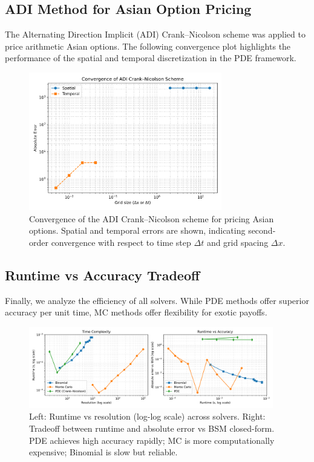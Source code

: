 \documentclass[12pt,a4paper]{article}
\begin{document}
\subsection{ADI Method for Asian Option Pricing}

The Alternating Direction Implicit (ADI) Crank–Nicolson scheme was applied to price arithmetic Asian options. The following convergence plot highlights the performance of the spatial and temporal discretization in the PDE framework.
\begin{figure}[H]
    \centering
    \includegraphics[width=0.75\textwidth]{../plots/asian_adi_convergence.png}
    \caption{Convergence of the ADI Crank–Nicolson scheme for pricing Asian options. Spatial and temporal errors are shown, indicating second-order convergence with respect to time step $\Delta t$ and grid spacing $\Delta x$.}
\end{figure}

\subsection{Runtime vs Accuracy Tradeoff}

Finally, we analyze the efficiency of all solvers. While PDE methods offer superior accuracy per unit time, MC methods offer flexibility for exotic payoffs.

\begin{figure}[H]
    \centering
    \includegraphics[width=0.95\textwidth]{../plots/error_runtime_comparison.png}
    \caption{Left: Runtime vs resolution (log-log scale) across solvers. Right: Tradeoff between runtime and absolute error vs BSM closed-form. PDE achieves high accuracy rapidly; MC is more computationally expensive; Binomial is slow but reliable.}
\end{figure}
\newpage
\end{document}
